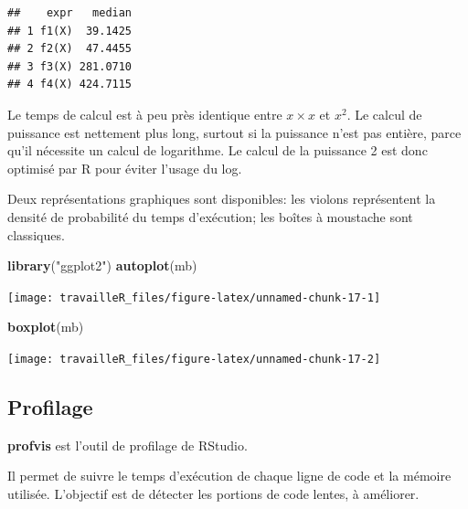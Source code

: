 \documentclass[
  12pt,
  french,
  a4paper,
  extrafontsizes,onecolumn,openright
  ]{memoir}
\newenvironment{Shaded}{\begin{snugshade}}{\end{snugshade}}
\newcommand{\KeywordTok}[1]{\textcolor[rgb]{0.13,0.29,0.53}{\textbf{#1}}}
\newcommand{\NormalTok}[1]{#1}
\newcommand{\StringTok}[1]{\textcolor[rgb]{0.31,0.60,0.02}{#1}}
\begin{document}
\begin{verbatim}
##    expr   median
## 1 f1(X)  39.1425
## 2 f2(X)  47.4455
## 3 f3(X) 281.0710
## 4 f4(X) 424.7115
\end{verbatim}

\normalsize

Le temps de calcul est à peu près identique entre \(x \times x\) et \(x^2\).
Le calcul de puissance est nettement plus long, surtout si la puissance n'est pas entière, parce qu'il nécessite un calcul de logarithme.
Le calcul de la puissance 2 est donc optimisé par R pour éviter l'usage du log.

Deux représentations graphiques sont disponibles: les violons représentent la densité de probabilité du temps d'exécution; les boîtes à moustache sont classiques.

\scriptsize

\begin{Shaded}
\begin{Highlighting}[]
\KeywordTok{library}\NormalTok{(}\StringTok{"ggplot2"}\NormalTok{)}
\KeywordTok{autoplot}\NormalTok{(mb)}
\end{Highlighting}
\end{Shaded}

\begin{center}\texttt{[image: travailleR\_files/figure-latex/unnamed-chunk-17-1]} \end{center}

\begin{Shaded}
\begin{Highlighting}[]
\KeywordTok{boxplot}\NormalTok{(mb)}
\end{Highlighting}
\end{Shaded}

\begin{center}\texttt{[image: travailleR\_files/figure-latex/unnamed-chunk-17-2]} \end{center}

\normalsize

\hypertarget{profilage}{%
\subsection{Profilage}\label{profilage}}

\textbf{profvis} est l'outil de profilage de RStudio.

Il permet de suivre le temps d'exécution de chaque ligne de code et la mémoire utilisée.
L'objectif est de détecter les portions de code lentes, à améliorer.
\end{document}
